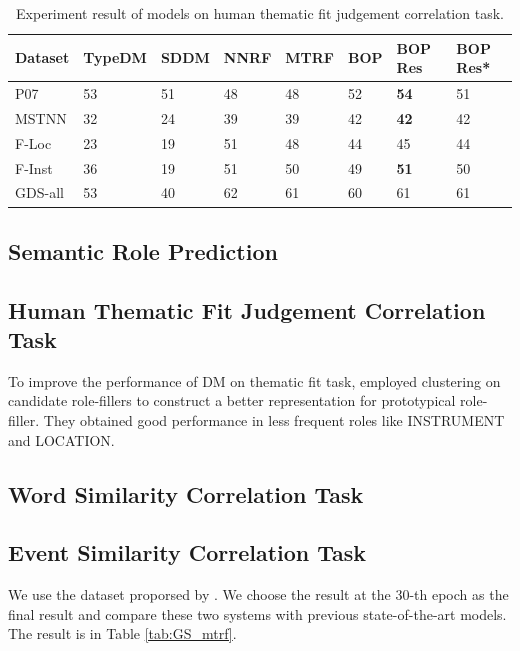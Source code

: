 \documentclass[a4paper]{article}
\begin{document}
\begin{table}[t]
\centering
\begin{tabular}{l|l|l||l|l|l|l||l}
Dataset &   TypeDM  &   SDDM    &   NNRF    &   MTRF    &   BOP &   BOP Res     &   BOP Res*    \\ \hline
P07     &   53      &   51      &   48      &   48      &   52  &   \textbf{54} &   51          \\
MSTNN   &   32      &   24      &   39      &   39      &   42  &   \textbf{42} &   42          \\
F-Loc   &   23      &   19      &   51      &   48      &   44  &   45          &   44          \\
F-Inst  &   36      &   19      &   51      &   50      &   49  &   \textbf{51} &   50          \\
GDS-all &   53      &   40      &   62      &   61      &   60  &   61          &   61          \\
\end{tabular}
\caption{\label{tab:eval-thematic} Experiment result of models on human thematic fit judgement correlation task.}
\end{table}


\subsection{Semantic Role Prediction}  \label{sec:roleprediction}

\subsection{Human Thematic Fit Judgement Correlation Task}  \label{sec:thematicfit}
To improve the performance of DM on thematic fit task, \citet{greenberg2015improving} employed clustering on candidate role-fillers to construct a better representation for prototypical role-filler. They obtained good performance in less frequent roles like INSTRUMENT and LOCATION. 

\subsection{Word Similarity Correlation Task}  \label{sec:wordsim}


\subsection{Event Similarity Correlation Task}  \label{sec:eventsim}
We use the dataset proporsed by \citet{grefenstette2015concrete}.
We choose the result at the $30$-th epoch as the final result and compare these two systems with previous state-of-the-art models. The result is in Table \ref{tab:GS_mtrf}. 
\end{document}
